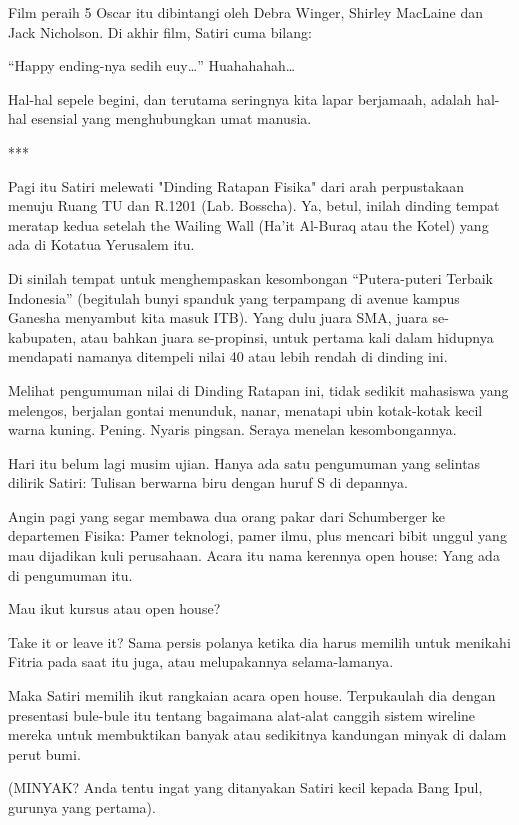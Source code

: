 Film peraih 5 Oscar itu dibintangi oleh Debra Winger, Shirley MacLaine dan Jack Nicholson. Di akhir film, Satiri cuma bilang:

“Happy ending-nya sedih euy…” Huahahahah…

Hal-hal sepele begini, dan terutama seringnya kita lapar berjamaah, adalah hal-hal esensial yang menghubungkan umat manusia.

***

Pagi itu Satiri melewati "Dinding Ratapan Fisika" dari arah perpustakaan menuju Ruang TU dan R.1201 (Lab. Bosscha). Ya, betul, inilah dinding tempat meratap kedua setelah the Wailing Wall (Ha’it Al-Buraq atau the Kotel) yang ada di Kotatua Yerusalem itu.

Di sinilah tempat untuk menghempaskan kesombongan “Putera-puteri Terbaik Indonesia” (begitulah bunyi spanduk yang terpampang di avenue kampus Ganesha menyambut kita masuk ITB). Yang dulu juara SMA, juara se-kabupaten, atau bahkan juara se-propinsi, untuk pertama kali dalam hidupnya mendapati namanya ditempeli nilai 40 atau lebih rendah di dinding ini.

Melihat pengumuman nilai di Dinding Ratapan ini, tidak sedikit mahasiswa yang melengos, berjalan gontai menunduk, nanar, menatapi ubin kotak-kotak kecil warna kuning. Pening. Nyaris pingsan. Seraya menelan kesombongannya.

Hari itu belum lagi musim ujian. Hanya ada satu pengumuman yang selintas dilirik Satiri: Tulisan berwarna biru dengan huruf S di depannya.

Angin pagi yang segar membawa dua orang pakar dari Schumberger ke departemen Fisika: Pamer teknologi, pamer ilmu, plus mencari bibit unggul yang mau dijadikan kuli perusahaan. Acara itu nama kerennya open house: Yang ada di pengumuman itu.

Mau ikut kursus atau open house?

Take it or leave it? Sama persis polanya ketika dia harus memilih untuk menikahi Fitria pada saat itu juga, atau melupakannya selama-lamanya.

Maka Satiri memilih ikut rangkaian acara open house. Terpukaulah dia dengan presentasi bule-bule itu tentang bagaimana alat-alat canggih sistem wireline mereka untuk membuktikan banyak atau sedikitnya kandungan minyak di dalam perut bumi.

(MINYAK? Anda tentu ingat yang ditanyakan Satiri kecil kepada Bang Ipul, gurunya yang pertama).

